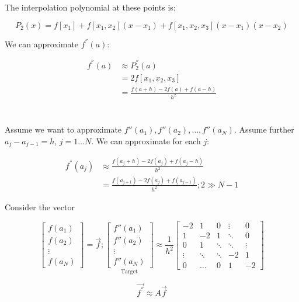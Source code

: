 The interpolation polynomial at these points is:

\[
	P_2(x) = f[x_1] + f[x_1, x_2](x - x_1) + f[x_1, x_2, x_3](x - x_1)(x - x_2)
\] 

We can approximate $f^{''}(a)$:

\begin{align*}
	f^{''}(a) 
		&\approx P_2^{''}(a) \\
		&= 2 f[x_1, x_2, x_3] \\
		&= \frac{f(a + h) - 2f(a) + f(a - h)}{h^2}
\end{align*}

\section{}

Assume we want to approximate $f''(a_1), f''(a_2), \dotsc, f''(a_N)$. Assume further $a_j - a_{j - 1} = h$, $j = 1 \dotsc N$. We can approximate for each $j$:

\begin{align*}
	f^{''}(a_j) 
		&\approx \frac{f(a_j + h) - 2f(a_j) + f(a_j -h)}{h^2} \\
		&= \frac{f(a_{j + 1}) - 2f(a_j) + f(a_{j - 1})}{h^2}; 2 \gg N - 1
\end{align*}

Consider the vector

\[
	\begin{bmatrix}
		f(a_1) \\
		f(a_2) \\
		\vdots \\
		f(a_N)
	\end{bmatrix}
	= \overrightarrow{f};
	\underset{\text{Target}}{
		\begin{bmatrix}
			f''(a_1) \\
			f''(a_2) \\
			\vdots \\
			f''(a_N)
		\end{bmatrix}
	} \approx \frac{1}{h^2}
	\begin{bmatrix}
		-2      &  1      & 0      & \vdots & 0 \\
		 1      & -2      & 1      & \ddots & 0 \\
		 0      &  1      & \ddots & \ddots & \vdots \\
		 \vdots &  \ddots & \ddots & -2     & 1 \\
		 0      &  \hdots & 0      & 1      & -2 
	\end{bmatrix}
\]

\[
	\overrightarrow{f^{''}} \approx A \overrightarrow{f}
\]
